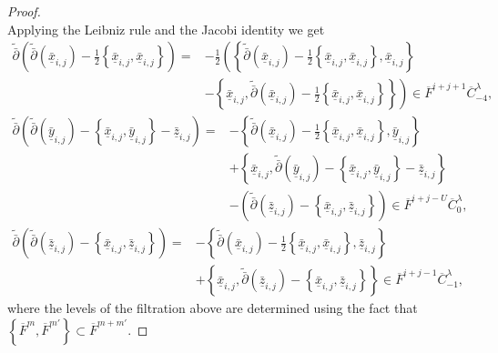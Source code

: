 \documentclass[a4paper]{article}
\numberwithin{equation}{section}
\begin{document}
\begin{proof}
\begin{equation}
\end{equation}
Applying the Leibniz rule and the Jacobi identity we get
\begin{equation}
\begin{split}
\tilde{\bar{\partial}}\left(\tilde{\bar{\partial}}(\bar{\underline{x}}_{i,j})-\frac{1}{2}\left\{\bar{\underline{x}}_{i,j},\bar{\underline{x}}_{i,j}\right\}\right)=&-\frac{1}{2}\left(\left\{\tilde{\bar{\partial}}(\bar{\underline{x}}_{i,j})-\frac{1}{2}\left\{\bar{\underline{x}}_{i,j},\bar{\underline{x}}_{i,j}\right\},\bar{\underline{x}}_{i,j}\right\}\right. \\
&\left.-\left\{\bar{\underline{x}}_{i,j},\tilde{\bar{\partial}}(\bar{\underline{x}}_{i,j})-\frac{1}{2}\left\{\bar{\underline{x}}_{i,j},\bar{\underline{x}}_{i,j}\right\}\right\}\right)\in\overline{F}^{i+j+1}\overline{C}_{-4}^\lambda,
\end{split}
\end{equation}
\begin{equation}
\begin{split}
\tilde{\bar{\partial}}\left(\tilde{\bar{\partial}}(\bar{\underline{y}}_{i,j})-\left\{\bar{\underline{x}}_{i,j},\bar{\underline{y}}_{i,j}\right\}-\bar{\underline{z}}_{i,j}\right)=&-\left\{\tilde{\bar{\partial}}(\bar{\underline{x}}_{i,j})-\frac{1}{2}\left\{\bar{\underline{x}}_{i,j},\bar{\underline{x}}_{i,j}\right\},\bar{\underline{y}}_{i,j}\right\} \\
&+\left\{\bar{\underline{x}}_{i,j},\tilde{\bar{\partial}}(\bar{\underline{y}}_{i,j})-\left\{\bar{\underline{x}}_{i,j},\bar{\underline{y}}_{i,j}\right\}-\bar{\underline{z}}_{i,j}\right\} \\
&-\left(\tilde{\bar{\partial}}(\bar{\underline{z}}_{i,j})-\left\{\bar{\underline{x}}_{i,j},\bar{\underline{z}}_{i,j}\right\}\right)\in\overline{F}^{i+j-U}\overline{C}_0^\lambda,
\end{split}
\end{equation}
\begin{equation}
\begin{split}
\tilde{\bar{\partial}}\left(\tilde{\bar{\partial}}(\bar{\underline{z}}_{i,j})-\left\{\bar{\underline{x}}_{i,j},\bar{\underline{z}}_{i,j}\right\}\right)=&-\left\{\tilde{\bar{\partial}}(\bar{\underline{x}}_{i,j})-\frac{1}{2}\left\{\bar{\underline{x}}_{i,j},\bar{\underline{x}}_{i,j}\right\},\bar{\underline{z}}_{i,j}\right\} \\
&+\left\{\bar{\underline{x}}_{i,j},\tilde{\bar{\partial}}(\bar{\underline{z}}_{i,j})-\left\{\bar{\underline{x}}_{i,j},\bar{\underline{z}}_{i,j}\right\}\right\}\in\overline{F}^{i+j-1}\overline{C}_{-1}^\lambda,
\end{split}
\end{equation}
where the levels of the filtration above are determined using the fact that $\left\{\overline{F}^m,\overline{F}^{m'}\right\}\subset\overline{F}^{m+m'}$.


\end{proof}
\end{document}
